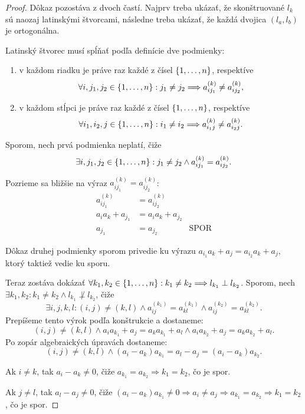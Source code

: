 \begin{toreview}
\begin{proof}
Dôkaz pozostáva z dvoch častí.
Najprv treba ukázať, že skonštruované $l_k$ sú naozaj latinskými štvorcami, následne treba ukázať, že každá dvojica $(l_a, l_b)$ je ortogonálna.

Latinský štvorec musí spĺňať podľa definície dve podmienky:
\begin{enumerate}
    \item v každom riadku je práve raz každé z čísel $\left\{1, \ldots, n\right\}$, respektíve $$\forall i, j_1, j_2 \in \left\{1, \ldots, n\right\}: j_1 \neq j_2 \Longrightarrow a_{ij_1}^{(k)} \neq a_{ij_2}^{(k)},$$
    \item v každom stĺpci je práve raz každé z čísel $\left\{1, \ldots, n\right\}$, respektíve $$\forall i_1, i_2, j \in \left\{1, \ldots, n\right\}: i_1 \neq i_2 \Longrightarrow a_{i_1j}^{(k)} \neq a_{i_2j}^{(k)}.$$
\end{enumerate}

Sporom, nech prvá podmienka neplatí, čiže $$\exists i, j_1, j_2  \in \left\{1, \ldots, n\right\}: j_1 \neq j_2 \wedge a_{ij_1}^{(k)} = a_{ij_2}^{(k)}.$$

Pozrieme sa bližšie na výraz $a_{ij_1}^{(k)} = a_{ij_2}^{(k)}$:
\begin{align*}
a_{ij_1}^{(k)} &= a_{ij_2}^{(k)}\\
a_i a_{k} + a_{j_1} &= a_i a_{k} + a_{j_2}\\
a_{j_1} &= a_{j_2}&\text{SPOR}
\end{align*}

Dôkaz druhej podmienky sporom privedie ku výrazu $a_{i_1}a_k + a_j = a_{i_2}a_k + a_j$, ktorý taktiež vedie ku sporu.

Teraz zostáva dokázať $\forall k_1, k_2 \in \left\{1, \ldots, n\right\}: k_1 \neq k_2 \Longrightarrow l_{k_1} \perp l_{k_2}$.
Sporom, nech $\exists k_1, k_2: k_1 \neq k_2 \wedge l_{k_1} \not\perp l_{k_2}$, čiže $$\exists i, j, k, l: (i, j) \neq (k, l) \wedge a^{(k_1)}_{ij} = a^{(k_1)}_{kl} \wedge a^{(k_2)}_{ij} = a^{(k_2)}_{kl}.$$
Prepíšeme tento výrok podľa konštrukcie a dostaneme:
$$
(i, j) \neq (k, l) \wedge a_i a_{k_1} + a_j = a_k a_{k_1} + a_l \wedge a_i a_{k_2} + a_j = a_k a_{k_2} + a_l.
$$
Po zopár algebraických úpravách dostaneme:
$$
(i, j) \neq (k, l) \wedge (a_i - a_k) a_{k_1} = a_l - a_j = (a_i - a_k)a_{k_2}.
$$

Ak $i \neq k$, tak $a_i - a_k \neq 0$, čiže $a_{k_1} = a_{k_2} \Longrightarrow k_1 = k_2$, čo je spor.

Ak $j \neq l$, tak $a_l - a_j \neq 0$, čiže $(a_i - a_k) a_{k_1} \neq 0 \Longrightarrow a_i \neq a_j \Longrightarrow a_{k_1} = a_{k_2} \Longrightarrow k_1 = k_2$, čo je spor.


\end{proof}
\end{toreview}

